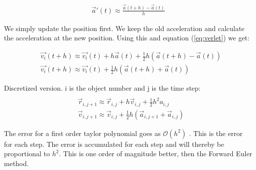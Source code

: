 \begin{align*}
	\vec{a}'(t) \approx \frac{\vec{a}(t+h) - \vec{a}(t)}{h}
\end{align*}

We simply update the position first. We keep the old acceleration and calculate the acceleration at the new position.  Using this and equation (\ref{eq:verlet}) we get: 

\begin{align*}
	&\vec{v_i}(t+h) \approx \vec{v_i}(t) + h \vec{a}(t) + \frac{1}{2} h(\vec{a}(t+h) - \vec{a}(t))
	\\
	&\vec{v_i}(t+h) \approx \vec{v_i}(t) + \frac{1}{2} h(\vec{a}(t+h) + \vec{a}(t))
\end{align*}

Discretized version. i is the object number and j is the time step:
\begin{align*}
	\\
	&\vec{r}_{i,j+1} \approx \vec{r}_{i,j} + h \vec{v}_{i,j} + \frac{1}{2} h^2 a_{i,j}
	\\
	&\vec{v}_{i,j+1} \approx \vec{v}_{i,j} +\frac{1}{2} h(\vec{a}_{i,j+1} + \vec{a}_{i,j})
\end{align*}


The error for a first order taylor polynomial goes as $\mathcal{O}(h^2)$ \cite{compphys}. This is the error for each step. The error is accumulated for each step and will thereby be proportional to $h^2$. This is one order of magnitude better, then the Forward Euler method. 
















